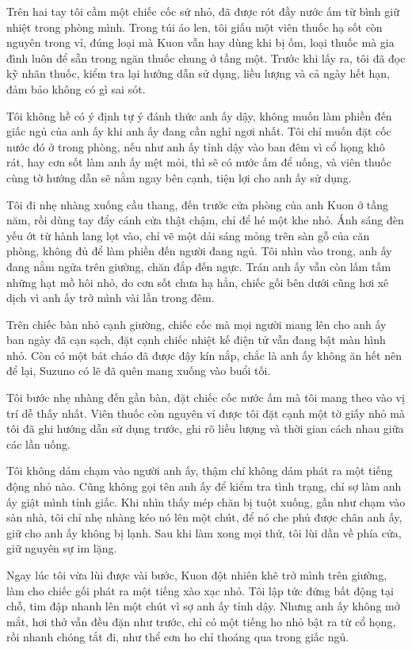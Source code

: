 \documentclass[../main.tex]{subfiles}
\begin{document}
Trên hai tay tôi cầm một chiếc cốc sứ nhỏ, đã được rót đầy nước ấm từ bình giữ nhiệt trong phòng mình. Trong túi áo len, tôi giấu một viên thuốc hạ sốt còn nguyên trong vỉ, đúng loại mà Kuon vẫn hay dùng khi bị ốm, loại thuốc mà gia đình luôn để sẵn trong ngăn thuốc chung ở tầng một. Trước khi lấy ra, tôi đã đọc kỹ nhãn thuốc, kiểm tra lại hướng dẫn sử dụng, liều lượng và cả ngày hết hạn, đảm bảo không có gì sai sót.

Tôi không hề có ý định tự ý đánh thức anh ấy dậy, không muốn làm phiền đến giấc ngủ của anh ấy khi anh ấy đang cần nghỉ ngơi nhất. Tôi chỉ muốn đặt cốc nước đó ở trong phòng, nếu như anh ấy tỉnh dậy vào ban đêm vì cổ họng khô rát, hay cơn sốt làm anh ấy mệt mỏi, thì sẽ có nước ấm để uống, và viên thuốc cùng tờ hướng dẫn sẽ nằm ngay bên cạnh, tiện lợi cho anh ấy sử dụng.

Tôi đi nhẹ nhàng xuống cầu thang, đến trước cửa phòng của anh Kuon ở tầng năm, rồi dùng tay đẩy cánh cửa thật chậm, chỉ để hé một khe nhỏ. Ánh sáng đèn yếu ớt từ hành lang lọt vào, chỉ vẽ một dải sáng mỏng trên sàn gỗ của căn phòng, không đủ để làm phiền đến người đang ngủ. Tôi nhìn vào trong, anh ấy đang nằm ngửa trên giường, chăn đắp đến ngực. Trán anh ấy vẫn còn lấm tấm những hạt mồ hôi nhỏ, do cơn sốt chưa hạ hẳn, chiếc gối bên dưới cũng hơi xê dịch vì anh ấy trở mình vài lần trong đêm.

Trên chiếc bàn nhỏ cạnh giường, chiếc cốc mà mọi người mang lên cho anh ấy ban ngày đã cạn sạch, đặt cạnh chiếc nhiệt kế điện tử vẫn đang bật màn hình nhỏ. Còn có một bát cháo đã được đậy kín nắp, chắc là anh ấy không ăn hết nên để lại, Suzuno có lẽ đã quên mang xuống vào buổi tối. 

Tôi bước nhẹ nhàng đến gần bàn, đặt chiếc cốc nước ấm mà tôi mang theo vào vị trí dễ thấy nhất. Viên thuốc còn nguyên vỉ được tôi đặt cạnh một tờ giấy nhỏ mà tôi đã ghi hướng dẫn sử dụng trước, ghi rõ liều lượng và thời gian cách nhau giữa các lần uống.

Tôi không dám chạm vào người anh ấy, thậm chí không dám phát ra một tiếng động nhỏ nào. Cũng không gọi tên anh ấy để kiểm tra tình trạng, chỉ sợ làm anh ấy giật mình tỉnh giấc. Khi nhìn thấy mép chăn bị tuột xuống, gần như chạm vào sàn nhà, tôi chỉ nhẹ nhàng kéo nó lên một chút, để nó che phủ được chân anh ấy, giữ cho anh ấy không bị lạnh. Sau khi làm xong mọi thứ, tôi lùi dần về phía cửa, giữ nguyên sự im lặng.

\ct

Ngay lúc tôi vừa lùi được vài bước, Kuon đột nhiên khẽ trở mình trên giường, làm cho chiếc gối phát ra một tiếng xào xạc nhỏ. Tôi lập tức đứng bất động tại chỗ, tim đập nhanh lên một chút vì sợ anh ấy tỉnh dậy. Nhưng anh ấy không mở mắt, hơi thở vẫn đều đặn như trước, chỉ có một tiếng ho nhỏ bật ra từ cổ họng, rồi nhanh chóng tắt đi, như thể cơn ho chỉ thoáng qua trong giấc ngủ.
\end{document}
